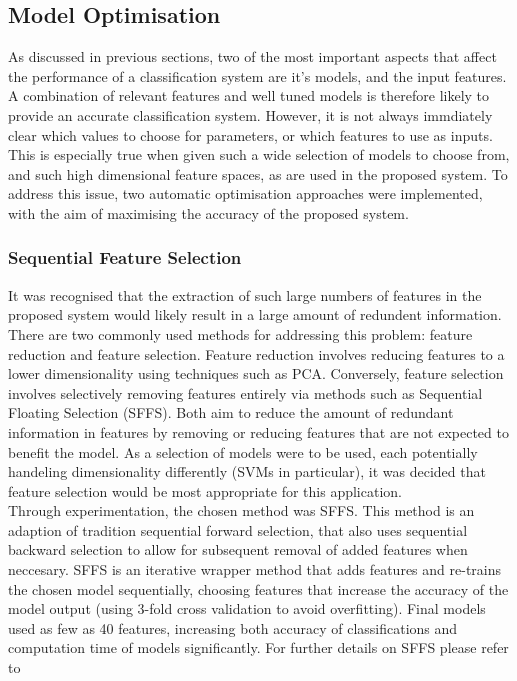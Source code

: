 \documentclass[titlepage, 12pt]{scrartcl} \usepackage{enumitem}
\begin{document}

\subsection{Model Optimisation}\label{optimise}
As discussed in previous sections, two of the most important aspects that affect
the performance of a classification system are it's models, and the input
features. A combination of relevant features and well tuned models is therefore
likely to provide an accurate classification system. However, it is not always
immdiately clear which values to choose for parameters, or which features to use as
inputs. This is especially true when given such a wide selection of models to
choose from, and such high dimensional feature spaces, as are used in the
proposed system. To address this issue, two automatic optimisation approaches
were implemented, with the aim of maximising the accuracy of the proposed
system. 

\subsubsection{Sequential Feature Selection}\label{SFS}
It was recognised that the extraction of such large numbers of features in the
proposed system would likely result in a large amount of redundent information.
There are two commonly used methods for addressing this problem: feature
reduction and feature selection. Feature reduction involves reducing features
to a lower dimensionality using techniques such as PCA. Conversely, feature
selection involves selectively removing features entirely via methods such as
Sequential Floating Selection (SFFS). Both aim to reduce the amount of
redundant information in features by removing or reducing features that are not
expected to benefit the model. As a selection of models were to be used, each
potentially handeling dimensionality differently (SVMs in particular), it was
decided that feature selection would be most appropriate for this
application.\\

Through experimentation, the chosen method was SFFS. This method is an adaption
of tradition sequential forward selection, that also uses sequential backward
selection to allow for subsequent removal of added features when neccesary.
SFFS is an iterative wrapper method that adds features and re-trains the chosen
model sequentially, choosing features that increase the accuracy of the model
output (using 3-fold cross validation to avoid overfitting). Final models used
as few as 40 features, increasing both accuracy of classifications and
computation time of models significantly. For further details on SFFS please
refer to~\parencite[p.3]{Ferri1994}
\end{document}
